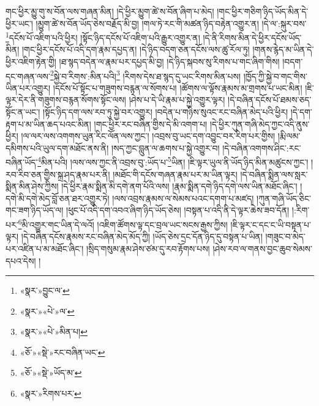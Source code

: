 གང་ཕྱིར་མྱུ་གུ་ས་བོན་ལས་གཞན་མིན། །དེ་ཕྱིར་མྱུག་ཚེ་ས་བོན་ཞིག་པ་མེད། །གང་ཕྱིར་གཅིག་ཉིད་ཡོད་མིན་དེ་ཕྱིར་ཡང་། །མྱུག་ཚེ་ས་བོན་ཡོད་ཅེས་བརྗོད་མི་བྱ། །གལ་ཏེ་རང་གི་མཚན་ཉིད་བརྟེན་འགྱུར་ན། །དེ་ལ་:སྐུར་བས་\footnote{«སྣར་»བྱུང་ལ་}དངོས་པོ་འཇིག་པའི་ཕྱིར། །སྟོང་ཉིད་དངོས་པོ་འཇིག་པའི་རྒྱུར་འགྱུར་ན། །དེ་ནི་རིགས་མིན་དེ་ཕྱིར་དངོས་ཡོད་མིན། །གང་ཕྱིར་དངོས་པོ་འདི་དག་རྣམ་དཔྱད་ན། །དེ་ཉིད་བདག་ཅན་དངོས་ལས་ཚུ་རོལ་ཏུ། །གནས་རྙེད་མ་ཡིན་དེ་ཕྱིར་འཇིག་རྟེན་གྱི། །ཐ་སྙད་བདེན་ལ་རྣམ་པར་དཔྱད་མི་བྱ། །དེ་ཉིད་སྐབས་སུ་རིགས་པ་གང་ཞིག་གིས། །བདག་དང་གཞན་ལས་\footnote{«སྣར་»«པེ་»ལ་}སྐྱེ་བ་རིགས་:མིན་པའི།\footnote{«སྣར་»«པེ་»མིན་པ།} །རིགས་དེས་ཐ་སྙད་དུ་ཡང་རིགས་མིན་པས། །ཁྱོད་ཀྱི་སྐྱེ་བ་གང་གིས་ཡིན་པར་འགྱུར། །དངོས་པོ་སྟོང་པ་གཟུགས་བརྙན་ལ་སོགས་པ། །ཚོགས་ལ་ལྟོས་རྣམས་མ་གྲགས་པ་ཡང་མིན། །ཇི་ལྟར་དེར་ནི་གཟུགས་བརྙན་སོགས་སྟོང་ལས། །ཤེས་པ་དེ་ཡི་རྣམ་པ་སྐྱེ་འགྱུར་ལྟར། །དེ་བཞིན་དངོས་པོ་ཐམས་ཅད་སྟོང་ན་ཡང་། །སྟོང་ཉིད་དག་ལས་རབ་ཏུ་སྐྱེ་བར་འགྱུར། །བདེན་པ་གཉིས་སུའང་རང་བཞིན་མེད་པའི་ཕྱིར། །དེ་དག་རྟག་པ་མ་ཡིན་ཆད་པའང་མིན། །གང་ཕྱིར་རང་བཞིན་གྱིས་དེ་མི་འགག་པ། །དེ་ཕྱིར་ཀུན་གཞི་མེད་ཀྱང་འདི་ནུས་ཕྱིར། །ལ་ལར་ལས་འགགས་ཡུན་རིང་ལོན་ལས་ཀྱང་། །འབྲས་བུ་ཡང་དག་འབྱུང་བར་རིག་པར་གྱིས། །རྨི་ལམ་དམིགས་པའི་ཡུལ་དག་མཐོང་ནས་ནི། །སད་ཀྱང་བླུན་ལ་ཆགས་པ་སྐྱེ་འགྱུར་བ། །དེ་བཞིན་འགགས་ཤིང་:རང་བཞིན་ཡོད་\footnote{«ཅོ་»«སྡེ་»རང་བཞིན་ཡང་}མིན་པའི། །ལས་ལས་ཀྱང་ནི་འབྲས་བུ་:ཡོད་པ་\footnote{«ཅོ་»«སྡེ་»ཡོད་མ་}ཡིན། །ཇི་ལྟར་ཡུལ་ནི་ཡོད་ཉིད་མིན་མཚུངས་ཀྱང་། །རབ་རིབ་ཅན་གྱིས་སྐྲ་ཤད་རྣམ་པར་ནི། །མཐོང་གི་དངོས་གཞན་རྣམ་པར་མ་ཡིན་ལྟར། །དེ་བཞིན་སྨིན་ལས་སླར་སྨིན་མིན་ཤེས་ཀྱིས། །དེ་ཕྱིར་རྣམ་སྨིན་མི་དགེ་ནག་པོའི་ལས། །རྣམ་སྨིན་དགེ་ཉིད་དགེ་ལས་ཡིན་མཐོང་ཞིང་། །དགེ་མི་དགེ་མེད་བློ་ཅན་ཐར་འགྱུར་ཏེ། །ལས་འབྲས་རྣམས་ལ་སེམས་པའང་དགག་པ་མཛད། །ཀུན་གཞི་ཡོད་ཅིང་གང་ཟག་ཉིད་ཡོད་ལ། །ཕུང་པོ་འདི་དག་འབའ་ཞིག་ཉིད་ཡོད་ཅེས། །བསྟན་པ་འདི་ནི་དེ་ལྟར་ཆེས་ཟབ་དོན། །:རིག་པར་\footnote{«སྣར་»རིགས་པར་}མི་འགྱུར་གང་ཡིན་དེ་ལའོ། །འཇིག་ཚོགས་ལྟ་དང་བྲལ་ཡང་སངས་རྒྱས་ཀྱིས། །ཇི་ལྟར་ང་དང་ང་ཡི་བསྟན་པ་ལྟར། །དེ་བཞིན་དངོས་རྣམས་རང་བཞིན་མེད་མོད་ཀྱི། །ཡོད་ཅེས་དྲང་དོན་ཉིད་དུ་བསྟན་པ་ཡིན། །གཟུང་བ་མེད་པར་འཛིན་པ་མ་མཐོང་ཞིང་། །སྲིད་གསུམ་རྣམ་ཤེས་ཙམ་དུ་རབ་རྟོགས་པས། །ཤེས་རབ་ལ་གནས་བྱང་ཆུབ་སེམས་དཔའ་དེས། །
